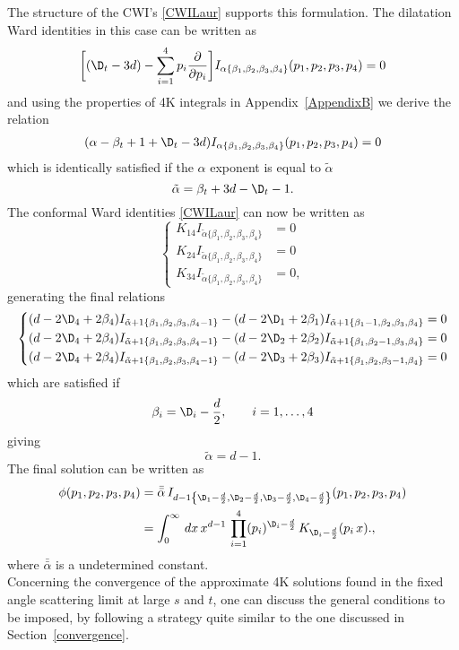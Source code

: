 \documentclass[a4paper,11pt,openright,twoside]{book}
\let\a=\alpha   \let\b=\beta   \let\g=\gamma   \let\d=\delta
\newcommand{\secref}[1]{Section~\ref{#1}}		%
\newcommand{\appref}[1]{Appendix~\ref{#1}}		%
\numberwithin{equation}{section}
\begin{document}
{{	The structure of the CWI's \eqref{CWILaur} supports this formulation. The dilatation Ward identities in this case can be written as
	\begin{equation}
		\bigg[(\D_t-3d)-\sum_{i=1}^4p_i\frac{\partial}{\partial p_i}\bigg]I_{\a\{\b_1,\b_2,\b_3,\b_4\}}(p_1,p_2,p_3,p_4)=0
	\end{equation}
	and using the properties of 4K integrals in \appref{AppendixB} we derive the relation
	\begin{align}
		(\a-\b_t+1+\D_t-3d)I_{\a\{\b_1,\b_2,\b_3,\b_4\}}(p_1,p_2,p_3,p_4)=0
	\end{align}
	which is identically satisfied if the $\a$ exponent is equal to $\tilde{\a}$
	\begin{equation}
		\tilde{\a}=\b_t+3d-\D_t-1.
	\end{equation}
	The conformal Ward identities \eqref{CWILaur} can now be written as
	\begin{equation}
		\left\{
		\begin{aligned}
			{K}_{14}I_{\tilde{\a}\{\b_1,\b_2,\b_3,\b_4\}}&=0\\
			{K}_{24}I_{\tilde{\a}\{\b_1,\b_2,\b_3,\b_4\}}&=0\\
			{K}_{34}I_{\tilde{\a}\{\b_1,\b_2,\b_3,\b_4\}}&=0,
		\end{aligned}
		\right.
	\end{equation}
	generating the final relations
	\begin{equation}
		\left\{
		\begin{aligned}
			(d-2\D_4+2\b_4)I_{\tilde{\a}+1\{\b_1,\b_2,\b_3,\b_4-1\}}-(d-2\D_1+2\b_1)I_{\tilde{\a}+1\{\b_1-1,\b_2,\b_3,\b_4\}}&=0\\
			(d-2\D_4+2\b_4)I_{\tilde{\a}+1\{\b_1,\b_2,\b_3,\b_4-1\}}-(d-2\D_2+2\b_2)I_{\tilde{\a}+1\{\b_1,\b_2-1,\b_3,\b_4\}}&=0\\
			(d-2\D_4+2\b_4)I_{\tilde{\a}+1\{\b_1,\b_2,\b_3,\b_4-1\}}-(d-2\D_3+2\b_3)I_{\tilde{\a}+1\{\b_1,\b_2,\b_3-1,\b_4\}}&=0\\
		\end{aligned}
		\right.
	\end{equation}
	which are satisfied if
	\begin{align}
		\b_i=\D_i-\frac{d}{2},\qquad i=1,\dots,4
	\end{align}
	giving
	\begin{equation}
		\tilde{\a}=d-1.
	\end{equation}
	The final solution can be written as
	\begin{align}
		\phi(p_1,p_2,p_3,p_4)&=\bar{\bar{\a}}\, I_{d-1\left\{\D_1-\frac{d}{2},\D_2-\frac{d}{2},\D_3-\frac{d}{2},\D_4-\frac{d}{2}\right\}}(p_1,p_2,p_3,p_4)\notag\\
		&=\int_0^\infty\,dx\,x^{d-1}\,\prod_{i=1}^4(p_i)^{\D_i-\frac{d}{2}}\,K_{\D_i-\frac{d}{2}}(p_i\,x).
		,\label{4Kfin}
	\end{align}
	where $\bar{\bar{\a}}$ is a undetermined constant. \\
	Concerning the convergence of the approximate 4K solutions found in the fixed angle scattering limit at large $s$ and $t$, one can discuss the general conditions to be 
	imposed, by following a strategy quite similar to the one discussed in \secref{convergence}.
	
}}
\end{document}
